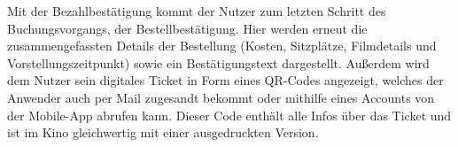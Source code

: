 Mit der Bezahlbestätigung kommt der Nutzer zum letzten Schritt des Buchungsvorgangs, der Bestellbestätigung. Hier werden erneut die zusammengefassten Details der Bestellung (Kosten, Sitzplätze, Filmdetails und Vorstellungszeitpunkt) sowie ein Bestätigungstext dargestellt. Außerdem wird dem Nutzer sein digitales Ticket in Form eines QR-Codes angezeigt, welches der Anwender auch per Mail zugesandt bekommt oder mithilfe eines Accounts von der Mobile-App abrufen kann. Dieser Code enthält alle Infos über das Ticket und ist im Kino gleichwertig mit einer ausgedruckten Version.